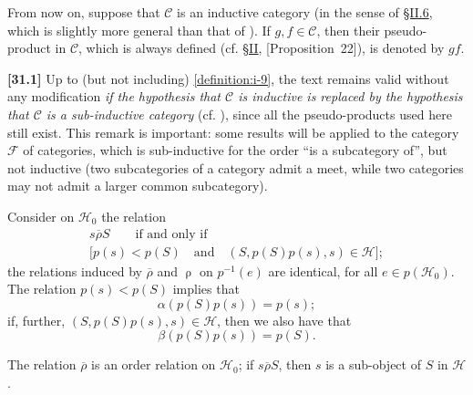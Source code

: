 \documentclass[a4paper,fleqn]{article}
\theoremstyle{plain}
\newenvironment{proposition}[1]
  {\renewcommand\theinnerproposition{#1}\innerproposition}
  {\endinnerproposition}
\theoremstyle{definition}
\newenvironment{longcomm}[1]
  {\noindent\textbf{[#1]}\rmfamily}
  {}
\newcommand{\textand}{\quad\text{and}\quad}
\newcommand{\CC}{\mathcal{C}}
\newcommand{\HH}{\mathcal{H}}
\newcommand{\FF}{\mathcal{F}}
\newcommand{\relrho}{\mathrel{\rho}}
\newcommand{\relrhobar}{\mathrel{\overline{\rho}}}
\begin{document}
From now on, suppose that $\CC$ is an inductive category (in the sense of \hyperref[section:ii.6]{§II.6}, which is slightly more general than that of \cite{3c}).
If $g,f\in\CC$, then their pseudo-product in $\CC$, which is always defined (cf. \hyperref[section:ii]{§II}, \hyperref[proposition:i-22][Proposition~22]), is denoted by $gf$.

\begin{longcomm}{31.1}
  Up to (but not including) \cref{definition:i-9}, the text remains valid without any modification \emph{if the hypothesis that $\CC$ is inductive is replaced by the hypothesis that $\CC$ is a sub-inductive category} (cf. \cite{coll69}), since all the pseudo-products used here still exist.
  This remark is important: some results will be applied to the category $\FF$ of categories, which is sub-inductive for the order ``is a subcategory of'', but not inductive (two subcategories of a category admit a meet, while two categories may not admit a larger common subcategory).
\end{longcomm}

Consider on $\HH_0$ the relation
\[
  \begin{gathered}
    s\relrhobar S
    \qquad\text{if and only if}
  \\\big[p(s)<p(S)
    \textand
    (S,p(S)p(s),s)\in\HH\big];
  \end{gathered}
\]
the relations induced by $\relrhobar$ and $\relrho$ on $p^{-1}(e)$ are identical, for all $e\in p(\HH_0)$.
The relation $p(s)<p(S)$ implies that
\[
  \alpha(p(S)p(s))
  = p(s);
\]
if, further, $(S,p(S)p(s),s)\in\HH$, then we also have that
\[
  \beta(p(S)p(s))
  = p(S).
\]

\begin{proposition}{3}
\label{proposition:i-3}
  The relation $\relrhobar$ is an order relation on $\HH_0$;
  if $s\relrhobar S$, then $s$ is a sub-object \cite{5} of $S$ in $\HH$.
\end{proposition}
\end{document}
